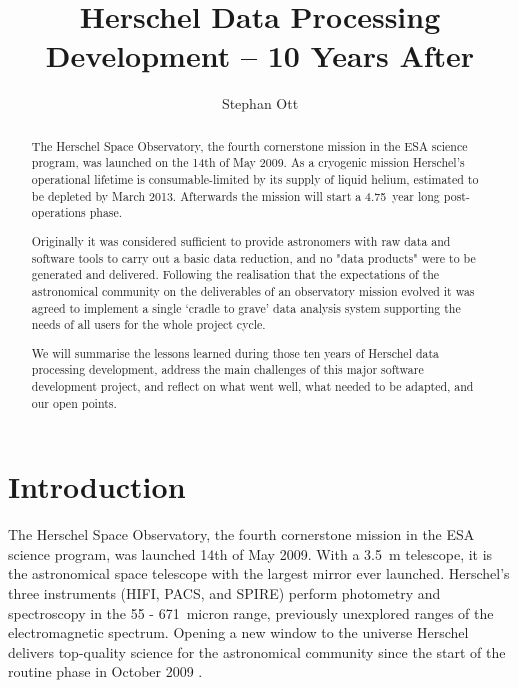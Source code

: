 
\resetcounters




\title{Herschel Data Processing Development -- 10 Years After}
\author{Stephan Ott}


\begin{abstract}
The Herschel Space Observatory, the fourth cornerstone mission in the ESA science program, was launched on the 14th of May 2009. As a cryogenic mission Herschel's operational lifetime is consumable-limited by its supply of liquid helium, estimated to be depleted by March 2013. Afterwards the mission will start a 4.75~year long post-operations phase.

Originally it was considered sufficient to provide astronomers with raw data and software tools to carry out a basic data reduction, and no "data products" were to be generated and delivered. Following the realisation that the expectations of the astronomical community on the deliverables of an observatory mission evolved it was agreed to implement a single `cradle to grave' data analysis system supporting the needs of all users for the whole project cycle.

We will summarise the lessons learned during those ten years of Herschel data processing development, address the main challenges of this major software development project, and reflect on what went well, what needed to be adapted, and our open points.
\end{abstract}

\section{Introduction}
The Herschel Space Observatory, the fourth cornerstone mission in the ESA science program, was launched 14th of May 2009. With a 3.5~m telescope, it is the astronomical space telescope with the largest mirror ever launched. Herschel's three instruments (HIFI, PACS, and SPIRE) perform photometry and spectroscopy in the 55 - 671~micron range, previously unexplored ranges of the electromagnetic spectrum. Opening a new window to the universe Herschel delivers top-quality science for the astronomical community since the start of the routine phase in October 2009 \citep{Pilbratt10}.

